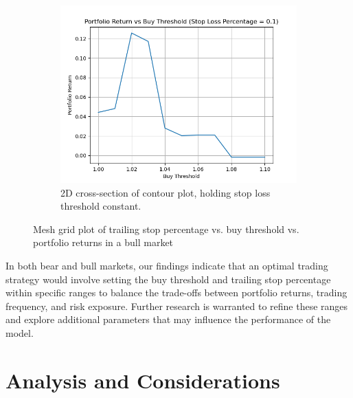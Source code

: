 \documentclass{article}
\begin{document}
\begin{figure}
\begin{subfigure}{0.495\textwidth}
    \end{subfigure}
    \label{fig:buyparameters}
    \begin{subfigure}{0.495\textwidth}
        \centering
        \includegraphics[width=\linewidth]{bullBuySlice.png}
        \caption{2D cross-section of contour plot, holding stop loss threshold constant.}
        \label{fig:bullstopPlot}
    \end{subfigure}
    \caption{Mesh grid plot of trailing stop percentage vs. buy threshold vs. portfolio returns in a bull market}

\end{figure}

In both bear and bull markets, our findings indicate that an optimal trading strategy would involve setting the buy threshold and trailing stop percentage within specific ranges to balance the trade-offs between portfolio returns, trading frequency, and risk exposure. Further research is warranted to refine these ranges and explore additional parameters that may influence the performance of the model.

\section{Analysis and Considerations}
\end{document}
